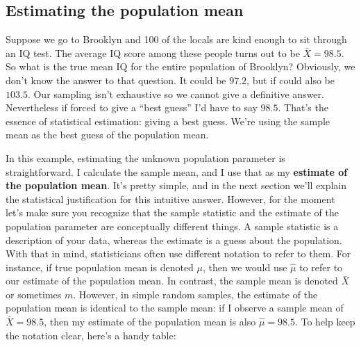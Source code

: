 \documentclass[
]{book}
\begin{document}
\hypertarget{estimating-the-population-mean}{%
\subsection{Estimating the population mean}\label{estimating-the-population-mean}}

Suppose we go to Brooklyn and 100 of the locals are kind enough to sit through an IQ test. The average IQ score among these people turns out to be \(\bar{X}=98.5\). So what is the true mean IQ for the entire population of Brooklyn? Obviously, we don't know the answer to that question. It could be \(97.2\), but if could also be \(103.5\). Our sampling isn't exhaustive so we cannot give a definitive answer. Nevertheless if forced to give a ``best guess'' I'd have to say \(98.5\). That's the essence of statistical estimation: giving a best guess. We're using the sample mean as the best guess of the population mean.

In this example, estimating the unknown population parameter is straightforward. I calculate the sample mean, and I use that as my \textbf{estimate of the population mean}. It's pretty simple, and in the next section we'll explain the statistical justification for this intuitive answer. However, for the moment let's make sure you recognize that the sample statistic and the estimate of the population parameter are conceptually different things. A sample statistic is a description of your data, whereas the estimate is a guess about the population. With that in mind, statisticians often use different notation to refer to them. For instance, if true population mean is denoted \(\mu\), then we would use \(\hat\mu\) to refer to our estimate of the population mean. In contrast, the sample mean is denoted \(\bar{X}\) or sometimes \(m\). However, in simple random samples, the estimate of the population mean is identical to the sample mean: if I observe a sample mean of \(\bar{X} = 98.5\), then my estimate of the population mean is also \(\hat\mu = 98.5\). To help keep the notation clear, here's a handy table:
\end{document}
